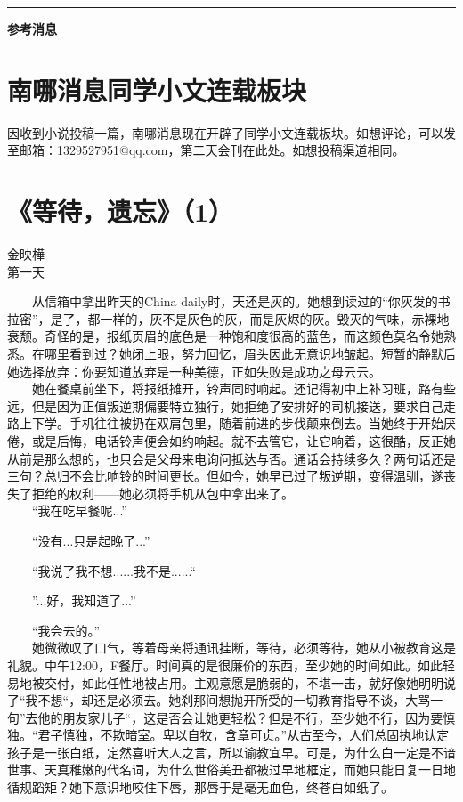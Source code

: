 \documentclass[letterpaper, 12pt]{article}
\begin{document}
\hrule
\vspace{4mm}
\centerline{\huge\textbf{参考消息}}
\begin{multicols}{2}
\section{南哪消息同学小文连载板块}
因收到小说投稿一篇，南哪消息现在开辟了同学小文连载板块。如想评论，可以发至邮箱：1329527951@qq.com，第二天会刊在此处。如想投稿渠道相同。
\section{《等待，遗忘》（1）}
金映樺\\

第一天

　　从信箱中拿出昨天的China daily时，天还是灰的。她想到读过的“你灰发的书拉密”，是了，都一样的，灰不是灰色的灰，而是灰烬的灰。毁灭的气味，赤裸地衰颓。奇怪的是，报纸页眉的底色是一种饱和度很高的蓝色，而这颜色莫名令她熟悉。在哪里看到过？她闭上眼，努力回忆，眉头因此无意识地皱起。短暂的静默后她选择放弃：你要知道放弃是一种美德，正如失败是成功之母云云。\\
  
　　她在餐桌前坐下，将报纸摊开，铃声同时响起。还记得初中上补习班，路有些远，但是因为正值叛逆期偏要特立独行，她拒绝了安排好的司机接送，要求自己走路上下学。手机往往被扔在双肩包里，随着前进的步伐颠来倒去。当她终于开始厌倦，或是后悔，电话铃声便会如约响起。就不去管它，让它响着，这很酷，反正她从前是那么想的，也只会是父母来电询问抵达与否。通话会持续多久？两句话还是三句？总归不会比响铃的时间更长。但如今，她早已过了叛逆期，变得温驯，遂丧失了拒绝的权利——她必须将手机从包中拿出来了。\\
  
　　“我在吃早餐呢...”
  
　　“没有...只是起晚了...”
  
　　“我说了我不想......我不是......“
  
　　”...好，我知道了...”
  
　　“我会去的。”\\
  
　　她微微叹了口气，等着母亲将通讯挂断，等待，必须等待，她从小被教育这是礼貌。中午12:00，F餐厅。时间真的是很廉价的东西，至少她的时间如此。如此轻易地被交付，如此任性地被占用。主观意愿是脆弱的，不堪一击，就好像她明明说了“我不想“，却还是必须去。她刹那间想抛开所受的一切教育指导不谈，大骂一句”去他的朋友家儿子“，这是否会让她更轻松？但是不行，至少她不行，因为要慎独。“君子慎独，不欺暗室。卑以自牧，含章可贞。”从古至今，人们总固执地认定孩子是一张白纸，定然喜听大人之言，所以谕教宜早。可是，为什么白一定是不谙世事、天真稚嫩的代名词，为什么世俗美丑都被过早地框定，而她只能日复一日地循规蹈矩？她下意识地咬住下唇，那唇于是毫无血色，终苍白如纸了。\\
  

\end{multicols}
\end{document}
